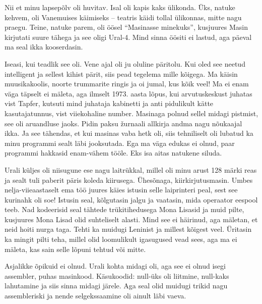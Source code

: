 Nii et minu lapsepõlv oli huvitav. Isal oli kapis kaks ülikonda. 
Üks, natuke kehvem, oli Vanemuises käimiseks -- teatris käidi tollal ülikonnas, 
mitte nagu praegu. Teine, natuke parem, oli öösel \enquote{Masinasse 
minekuks}, kusjuures Masin kirjutati suure tähega ja see oligi 
Ural-4. Mind sinna öösiti ei lastud, aga päeval ma seal 
ikka kooserdasin. 


Iseasi, kui teadlik see oli. Vene ajal oli ju oluline 
päritolu. Kui oled see neetud intelligent ja sellest kihist pärit, 
siis pead tegelema mille kõigega. Ma käisin muusikakoolis, noorte trummarite 
ringis ja oi jumal, kus kõik veel! Ma ei enam väga täpselt ei mäleta, aga 
ilmselt 1973. aasta lõpus, kui arvutuskeskust juhatas vist Tapfer, kutsuti mind juhataja kabinetti ja anti pidulikult kätte kasutajatunnus, vist
viiekohaline number. Masinaga polnud sellel midagi pistmist, 
see oli aruandluse jaoks. Pidin paksu žurnaali allkirja 
andma nagu nõukaajal ikka. Ja see tähendas, et kui masinas 
vaba hetk oli, siis tehniliselt oli lubatud ka minu programmi sealt läbi 
jooksutada. Ega ma väga edukas ei olnud, paar programmi hakkasid
enam-vähem tööle. Eks isa aitas natukene siluda.

Urali küljes oli niisugune 
ese nagu laitrükkal, millel oli minu arust 128 märki reas 
ja sealt tuli paberit päris koleda kiirusega. Ühesõnaga, kiirkirjutusmasin. Umbes nelja-viieaastaselt ema töö
juures käies istusin selle laiprinteri peal, sest see kurinahk oli soe! 
Istusin seal, kõlgutasin jalgu ja vaatasin, mida operaator 
eespool teeb. Nad kodeerisid seal tähtede 
trükitihedusega Mona Lisasid ja muid pilte, kusjuures Mona Lisad 
olid suhteliselt alasti. Mind see ei häirinud, aga mäletan, et
neid hoiti nurga taga. Tehti ka muidugi Leninist ja millest kõigest veel. Üritasin 
ka mingit pilti teha, millel olid loomulikult igasugused vead sees, aga ma ei 
mäleta, kas sain selle lõpuni tehtud või mitte. 


Asjalikke õpikuid ei olnud. Urali kohta midagi oli, aga 
see ei olnud isegi assembler, puhas masinkood. Käsukoodid: 
null-üks oli liitmine, null-kaks lahutamine ja siis 
sinna midagi järele. Aga seal olid muidugi trikid nagu assembleriski ja nende 
selgekssaamine oli ainult läbi vaeva. 

